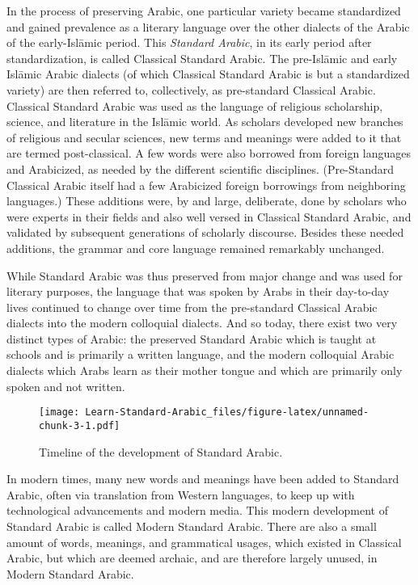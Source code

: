\documentclass[
  10pt,
]{book}
\begin{document}
In the process of preserving Arabic, one particular variety became standardized and gained prevalence as a literary language over the other dialects of the Arabic of the early-Islāmic period. This \emph{Standard Arabic}, in its early period after standardization, is called Classical Standard Arabic.
The pre-Islāmic and early Islāmic Arabic dialects (of which Classical Standard Arabic is but a standardized variety) are then referred to, collectively, as pre-standard Classical Arabic. Classical Standard Arabic was used as the language of religious scholarship, science, and literature in the Islāmic world. As scholars developed new branches of religious and secular sciences, new terms and meanings were added to it that are termed post-classical. A few words were also borrowed from foreign languages and Arabicized, as needed by the different scientific disciplines. (Pre-Standard Classical Arabic itself had a few Arabicized foreign borrowings from neighboring languages.) These additions were, by and large, deliberate, done by scholars who were experts in their fields and also well versed in Classical Standard Arabic, and validated by subsequent generations of scholarly discourse. Besides these needed additions, the grammar and core language remained remarkably unchanged.

While Standard Arabic was thus preserved from major change and was used for literary purposes, the language that was spoken by Arabs in their day-to-day lives continued to change over time from the pre-standard Classical Arabic dialects into the modern colloquial dialects. And so today, there exist two very distinct types of Arabic: the preserved Standard Arabic which is taught at schools and is primarily a written language, and the modern colloquial Arabic dialects which Arabs learn as their mother tongue and which are primarily only spoken and not written.

\begin{figure}
\centering
\texttt{[image: Learn-Standard-Arabic\_files/figure-latex/unnamed-chunk-3-1.pdf]}
\caption{\label{fig:unnamed-chunk-3}Timeline of the development of Standard Arabic.}
\end{figure}

In modern times, many new words and meanings have been added to Standard Arabic, often via translation from Western languages, to keep up with technological advancements and modern media.
This modern development of Standard Arabic is called Modern Standard Arabic.
There are also a small amount of words, meanings, and grammatical usages, which existed in Classical Arabic, but which are deemed archaic, and are therefore largely unused, in Modern Standard Arabic.
\end{document}
